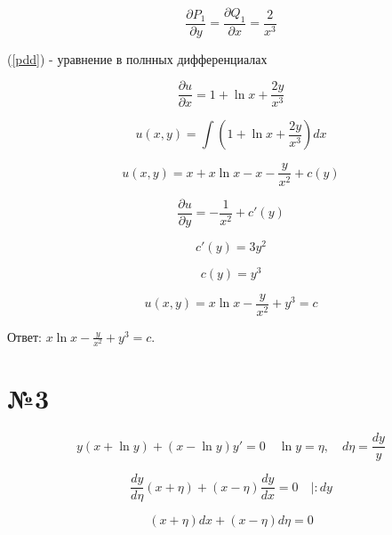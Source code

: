 \documentclass{article}
\begin{document}
\begin{equation*}
    \frac{\partial P_1}{\partial y}=\frac{\partial Q_1}{\partial x}=\frac{2}{x^3}
\end{equation*}

(\ref{pdd}) - уравнение в полнных дифференциалах

\begin{equation*}
    \frac{\partial u}{\partial x} = 1+\ln x+\frac{2y}{x^3}
\end{equation*}

\begin{equation*}
    u(x,y)= \int \left(1+\ln x+\frac{2y}{x^3}\right)dx
\end{equation*}

\begin{equation*}
    u(x,y)= x+x\ln x-x-\frac{y}{x^2}+c(y)
\end{equation*}

\begin{equation*}
    \frac{\partial u}{\partial y} = -\frac{1}{x^2}+c'(y)
\end{equation*}

\begin{equation*}
    c'(y)=3y^2
\end{equation*}

\begin{equation*}
    c(y)=y^3
\end{equation*}

\begin{equation*}
    u(x,y)=x\ln x-\frac{y}{x^2}+y^3=c
\end{equation*}

Ответ: $x\ln x-\frac{y}{x^2}+y^3=c$.

\section*{№3}

\begin{equation*}
    y(x+\ln y)+(x-\ln y)y'=0 \quad \ln y = \eta, \quad d\eta=\frac{dy}{y}
\end{equation*}

\begin{equation*}
    \frac{dy}{d\eta}(x+\eta)+(x-\eta)\frac{dy}{dx}=0 \quad |:dy
\end{equation*}

\begin{equation*}
    (x+\eta)dx+(x-\eta)d\eta=0
\end{equation*}
\end{document}
